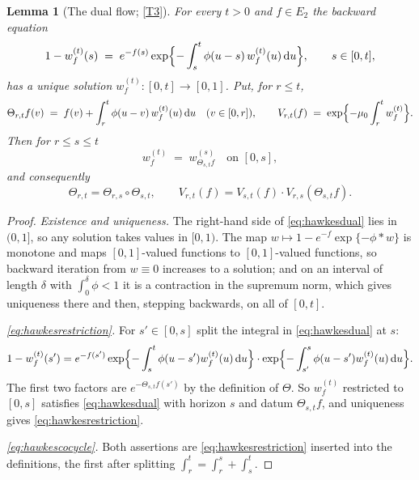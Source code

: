 \documentclass[11pt,a4paper]{article}
\theoremstyle{plain}
\newtheorem{lemma}[theorem]{Lemma}
\theoremstyle{definition}
\theoremstyle{remark}
\newcommand{\dif}{\,\mathrm{d}}
\begin{document}
\begin{lemma}[The dual flow; \eqref{T3}]
  \label{lem:hawkesflow}
  For every $t > 0$ and $f \in E_2$ the backward equation
  \begin{equation}
    \label{eq:hawkesdual}
    1 - w^{(t)}_f(s) \;=\; e^{-f(s)}
      \exp\Bigl\{ - \int_s^t \phi(u-s) \, w^{(t)}_f(u) \dif u \Bigr\} ,
    \qquad s \in [0,t] ,
  \end{equation}
  has a unique solution $w^{(t)}_f : [0,t] \to [0,1]$.  Put, for $r \leq t$,
  \[
    \Theta_{r,t}f(v) \;=\; f(v) + \int_r^t \phi(u-v) \, w^{(t)}_f(u) \dif u
      \quad (v \in [0,r]) ,
    \qquad
    V_{r,t}(f) \;=\; \exp\Bigl\{ -\mu_0 \int_r^t w^{(t)}_f \Bigr\} .
  \]
  Then for $r \leq s \leq t$
  \begin{equation}
    \label{eq:hawkesrestriction}
    w^{(t)}_f \;=\; w^{(s)}_{\Theta_{s,t}f} \quad\text{on } [0,s] ,
  \end{equation}
  and consequently
  \begin{equation}
    \label{eq:hawkescocycle}
    \Theta_{r,t} = \Theta_{r,s} \circ \Theta_{s,t} ,
    \qquad
    V_{r,t}(f) = V_{s,t}(f) \cdot V_{r,s}(\Theta_{s,t}f) .
  \end{equation}
\end{lemma}

\begin{proof}
  \emph{Existence and uniqueness.}  The right-hand side of \eqref{eq:hawkesdual}
  lies in $(0,1]$, so any solution takes values in $[0,1)$.  The map
  $w \mapsto 1 - e^{-f}\exp\{-\phi * w\}$ is monotone and maps $[0,1]$-valued
  functions to $[0,1]$-valued functions, so backward iteration from $w \equiv 0$
  increases to a solution; and on an interval of length $\delta$ with
  $\int_0^\delta \phi < 1$ it is a contraction in the supremum norm, which gives
  uniqueness there and then, stepping backwards, on all of $[0,t]$.

  \emph{\eqref{eq:hawkesrestriction}.}  For $s' \in [0,s]$ split the integral in
  \eqref{eq:hawkesdual} at $s$:
  \[
    1 - w^{(t)}_f(s')
      = e^{-f(s')} \exp\Bigl\{ -\int_s^t \phi(u-s') w^{(t)}_f(u)\dif u \Bigr\}
        \cdot \exp\Bigl\{ -\int_{s'}^{s} \phi(u-s') w^{(t)}_f(u)\dif u \Bigr\} .
  \]
  The first two factors are $e^{-\Theta_{s,t}f(s')}$ by the definition of
  $\Theta$.  So $w^{(t)}_f$ restricted to $[0,s]$ satisfies \eqref{eq:hawkesdual}
  with horizon $s$ and datum $\Theta_{s,t}f$, and uniqueness gives
  \eqref{eq:hawkesrestriction}.

  \emph{\eqref{eq:hawkescocycle}.}  Both assertions are \eqref{eq:hawkesrestriction}
  inserted into the definitions, the first after splitting
  $\int_r^t = \int_r^s + \int_s^t$.
\end{proof}
\end{document}
